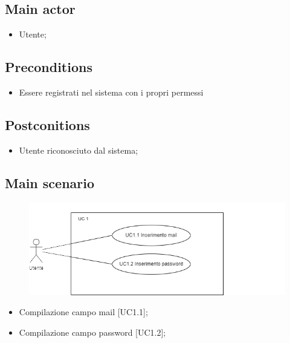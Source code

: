 \documentclass{article}
\begin{document}
     \subsection*{Main actor}
         \begin{itemize}
             \item Utente;
         \end{itemize}
     \subsection*{Preconditions} 
        \begin{itemize}
            \item Essere registrati nel sistema con i propri permessi
        \end{itemize}
               
    \subsection*{Postconitions}
        \begin{itemize}
            \item Utente riconosciuto dal sistema;
        \end{itemize}
    \subsection*{Main scenario}
        \begin{figure}[h]
            \centering
            \includegraphics{documenti/imgUML/UC1-zoom.png}
            \label{fig:immagine}
        \end{figure}
            
        \begin{itemize}
            \item Compilazione campo mail [UC1.1];
            \item Compilazione campo password [UC1.2];
        \end{itemize}
            
\end{document}
